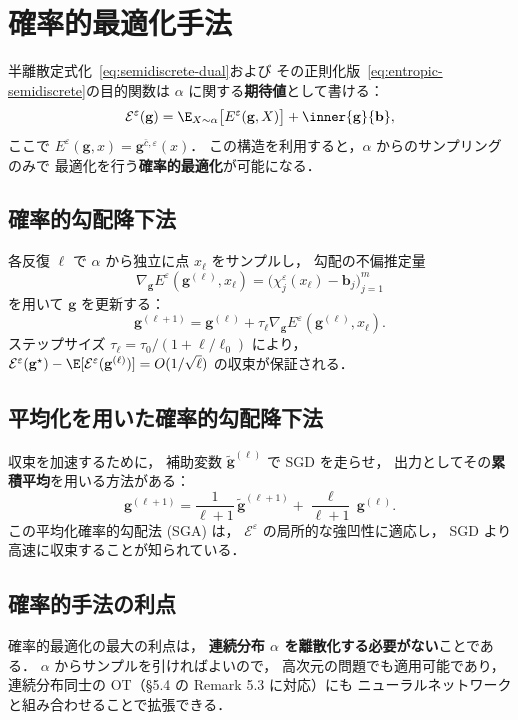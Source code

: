 \section{確率的最適化手法}\label{sec:stochastic}

半離散定式化~\eqref{eq:semidiscrete-dual}および
その正則化版~\eqref{eq:entropic-semidiscrete}の目的関数は
$\alpha$ に関する\textbf{期待値}として書ける：
\[
  \mathcal{E}^\varepsilon(\mathbf{g})
  = \E_{X \sim \alpha}\bigl[E^\varepsilon(\mathbf{g}, X)\bigr]
  + \inner{\mathbf{g}}{\mathbf{b}},
\]
ここで $E^\varepsilon(\mathbf{g}, x) = \mathbf{g}^{\bar{c},\varepsilon}(x)$．
この構造を利用すると，$\alpha$ からのサンプリングのみで
最適化を行う\textbf{確率的最適化}が可能になる．

\subsection{確率的勾配降下法}\label{subsec:sgd}

各反復 $\ell$ で $\alpha$ から独立に点 $x_\ell$ をサンプルし，
勾配の不偏推定量
\[
  \nabla_\mathbf{g} E^\varepsilon(\mathbf{g}^{(\ell)}, x_\ell)
  = \bigl(\chi^\varepsilon_j(x_\ell) - \mathbf{b}_j\bigr)_{j=1}^m
\]
を用いて $\mathbf{g}$ を更新する：
\begin{equation}\label{eq:sgd-update}
  \mathbf{g}^{(\ell+1)} = \mathbf{g}^{(\ell)}
  + \tau_\ell \nabla_\mathbf{g} E^\varepsilon(\mathbf{g}^{(\ell)}, x_\ell).
\end{equation}
ステップサイズ $\tau_\ell = \tau_0 / (1 + \ell/\ell_0)$ により，
$\mathcal{E}^\varepsilon(\mathbf{g}^\star) - \E[\mathcal{E}^\varepsilon(\mathbf{g}^{(\ell)})]
= O(1/\sqrt{\ell})$ の収束が保証される．

\subsection{平均化を用いた確率的勾配降下法}\label{subsec:sga}

収束を加速するために，
補助変数 $\tilde{\mathbf{g}}^{(\ell)}$ で SGD を走らせ，
出力としてその\textbf{累積平均}を用いる方法がある：
\[
  \mathbf{g}^{(\ell+1)}
  = \frac{1}{\ell+1}\, \tilde{\mathbf{g}}^{(\ell+1)}
  + \frac{\ell}{\ell+1}\, \mathbf{g}^{(\ell)}.
\]
この平均化確率的勾配法 (SGA) は，
$\mathcal{E}^\varepsilon$ の局所的な強凹性に適応し，
SGD より高速に収束することが知られている．

\subsection{確率的手法の利点}\label{subsec:stochastic-advantage}

確率的最適化の最大の利点は，
\textbf{連続分布 $\alpha$ を離散化する必要がない}ことである．
$\alpha$ からサンプルを引ければよいので，
高次元の問題でも適用可能であり，
連続分布同士の OT（§5.4 の Remark 5.3 に対応）にも
ニューラルネットワークと組み合わせることで拡張できる．

